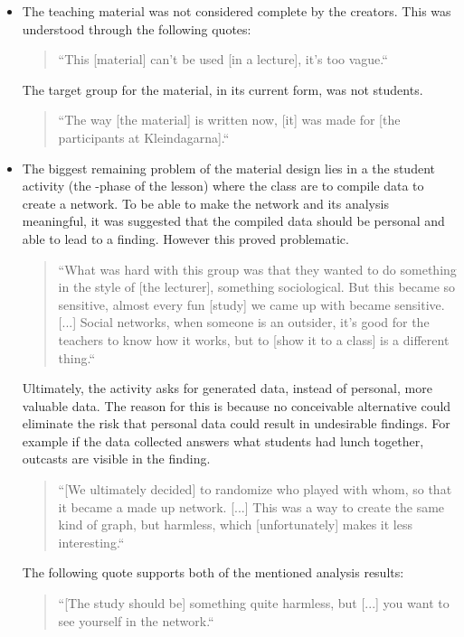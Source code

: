 \begin{itemize}
    \item The teaching material was not considered complete by the creators. This was understood through the following quotes:
	\begin{quote}
		“This [material] can't be used [in a lecture], it's too vague.“
	\end{quote}
	The target group for the material, in its current form, was not students.
	\begin{quote}
		“The way [the material] is written now, [it] was made for [the participants at Kleindagarna].“
	\end{quote}
	
    \item The biggest remaining problem of the material design lies in a the student activity (the -phase of the lesson) where the class are to compile data to create a network. To be able to make the network and its analysis meaningful, it was suggested that the compiled data should be personal and able to lead to a finding. However this proved problematic.
		\begin{quote}
			“What was hard with this group was that they wanted to do something in the style of [the lecturer], something sociological. But this became so sensitive, almost every fun [study] we came up with became sensitive. [...] Social networks, when someone is an outsider, it's good for the teachers to know how it works, but to [show it to a class] is a different thing.“
		\end{quote}
		Ultimately, the activity asks for generated data, instead of personal, more valuable data. The reason for this is because no conceivable alternative could eliminate the risk that personal data could result in undesirable findings. For example if the data collected answers what students had lunch together, outcasts are visible in the finding.
		\begin{quote}
			“[We ultimately decided] to randomize who played with whom, so that it became a made up network. [...] This was a way to create the same kind of graph, but harmless, which [unfortunately] makes it less interesting.“
		\end{quote}
		The following quote supports both of the mentioned analysis results:
		\begin{quote}
			“[The study should be] something quite harmless, but [...] you want to see yourself in the network.“
		\end{quote}
	\end{itemize}

